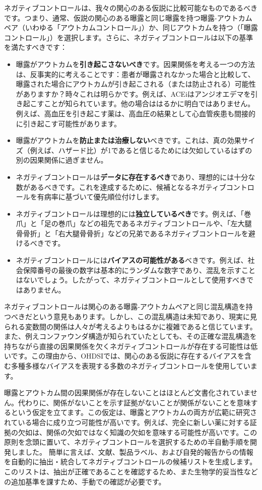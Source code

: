\documentclass[
  11pt]{book}
\providecommand{\tightlist}{%
  \setlength{\itemsep}{0pt}\setlength{\parskip}{0pt}}
\theoremstyle{definition}
\theoremstyle{definition}
\theoremstyle{definition}
\theoremstyle{definition}
\theoremstyle{remark}
\begin{document}
ネガティブコントロールは、我々の関心のある仮説に比較可能なものであるべきです。つまり、通常、仮説の関心のある曝露と同じ曝露を持つ曝露-アウトカムペア（いわゆる「アウトカムコントロール」）か、同じアウトカムを持つ（「曝露コントロール」）を選択します。さらに、ネガティブコントロールは以下の基準を満たすべきです：

\begin{itemize}
\tightlist
\item
  曝露がアウトカムを\textbf{引き起こさないべき}です。因果関係を考える一つの方法は、反事実的に考えることです：患者が曝露されなかった場合と比較して、曝露された場合にアウトカムが引き起こされる（または防止される）可能性がありますか？時々これは明らかです。例えば、ACEiはアンジオエデマを引き起こすことが知られています。他の場合ははるかに明白ではありません。例えば、高血圧を引き起こす薬は、高血圧の結果として心血管疾患も間接的に引き起こす可能性があります。
\item
  曝露がアウトカムを\textbf{防止または治療しない}べきです。これは、真の効果サイズ（例えば、ハザード比）が1であると信じるためには欠如しているはずの別の因果関係に過ぎません。
\item
  ネガティブコントロールは\textbf{データに存在するべき}であり、理想的には十分な数があるべきです。これを達成するために、候補となるネガティブコントロールを有病率に基づいて優先順位付けします。
\item
  ネガティブコントロールは理想的には\textbf{独立しているべき}です。例えば、「巻爪」と「足の巻爪」などの祖先であるネガティブコントロールや、「左大腿骨骨折」と「右大腿骨骨折」などの兄弟であるネガティブコントロールを避けるべきです。
\item
  ネガティブコントロールには\textbf{バイアスの可能性がある}べきです。例えば、社会保障番号の最後の数字は基本的にランダムな数字であり、混乱を示すことはないでしょう。したがって、ネガティブコントロールとして使用すべきではありません。
\end{itemize}

ネガティブコントロールは関心のある曝露-アウトカムペアと同じ混乱構造を持つべきだという意見もあります。しかし、この混乱構造は未知であり、現実に見られる変数間の関係は人々が考えるよりもはるかに複雑であると信じています。また、例えコンファウンダ構造が知られていたとしても、その正確な混乱構造を持ちながら直接の因果関係を欠くネガティブコントロールが存在する可能性は低いです。この理由から、OHDSIでは、関心のある仮説に存在するバイアスを含む多種多様なバイアスを表現する多数のネガティブコントロールを使用しています。

曝露とアウトカム間の因果関係が存在しないことはほとんど文書化されていません。代わりに、関係がないことを示す証拠がないことが関係がないことを意味するという仮定を立てます。この仮定は、曝露とアウトカムの両方が広範に研究されている場合に成り立つ可能性が高いです。例えば、完全に新しい薬に対する証拠の欠如は、関係の欠如ではなく知識の欠如を意味する可能性が高いです。この原則を念頭に置いて、ネガティブコントロールを選択するための半自動手順を開発しました。\citep{voss_2016} 簡単に言えば、文献、製品ラベル、および自発的報告からの情報を自動的に抽出・統合してネガティブコントロールの候補リストを生成します。このリストは、抽出が正確であることを確認するため、また生物学的妥当性などの追加基準を課すため、手動での確認が必要です。
\end{document}
